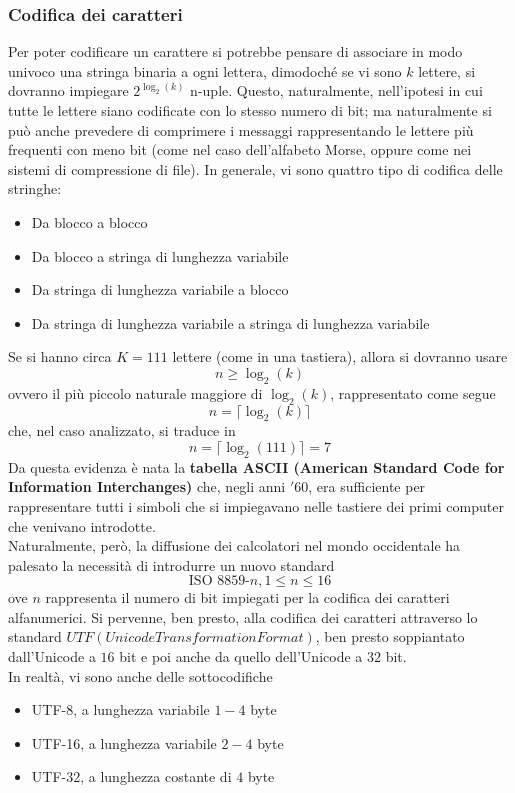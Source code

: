 \documentclass[a4paper]{extarticle}
\begin{document}
\vspace{1em}
\subsubsection{Codifica dei caratteri}
Per poter codificare un carattere si potrebbe pensare di associare in modo univoco una stringa binaria a ogni lettera, dimodoché se vi sono \(k\) lettere, si dovranno impiegare \(2^{\log_2(k)}\) n-uple. Questo, naturalmente, nell'ipotesi in cui tutte le lettere siano codificate con lo stesso numero di bit; ma naturalmente si può anche prevedere di comprimere i messaggi rappresentando le lettere più frequenti con meno bit (come nel caso dell'alfabeto Morse, oppure come nei sistemi di compressione di file). In generale, vi sono quattro tipo di codifica delle stringhe:
\begin{itemize}
    \item Da blocco a blocco
    \item Da blocco a stringa di lunghezza variabile
    \item Da stringa di lunghezza variabile a blocco
    \item Da stringa di lunghezza variabile a stringa di lunghezza variabile
\end{itemize}
Se si hanno circa \(K = 111\) lettere (come in una tastiera), allora si dovranno usare
\[n \geq \log_2(k)\]
ovvero il più piccolo naturale maggiore di \(\log_2(k)\), rappresentato come segue
\[n = \lceil \log_2(k) \rceil\]
che, nel caso analizzato, si traduce in
\[n = \lceil \log_2(111) \rceil = 7\]
Da questa evidenza è nata la \textbf{tabella ASCII (American Standard Code for Information Interchanges)} che, negli anni \('60\), era sufficiente per rappresentare tutti i simboli che si impiegavano nelle tastiere dei primi computer che venivano introdotte.\\
Naturalmente, però, la diffusione dei calcolatori nel mondo occidentale ha palesato la necessità di introdurre un nuovo standard
\[\text{ISO 8859-}n, 1 \leq n \leq 16\]
ove \(n\) rappresenta il numero di bit impiegati per la codifica dei caratteri alfanumerici. Si pervenne, ben presto, alla codifica dei caratteri attraverso lo standard \(UTF (Unicode Transformation Format)\), ben presto soppiantato dall'Unicode a \(16\) bit e poi anche da quello dell'Unicode a \(32\) bit.\\
In realtà, vi sono anche delle sottocodifiche
\begin{itemize}
    \item UTF-8, a lunghezza variabile \(1-4\) byte
    \item UTF-16, a lunghezza variabile \(2-4\) byte
    \item UTF-32, a lunghezza costante di \(4\) byte
\end{itemize}
\end{document}
